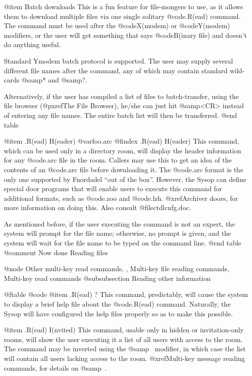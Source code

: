 @item Batch downloads
This is a fun feature for file-mongers to use, as it
allows them to download multiple files via one single solitary
@code{.R(ead)} command.  The command must be used after the @code{X(modem)}
or @code{Y(modem)} modifiers, or the user will get something that says
@code{B(inary file)} and doesn't do anything useful.

Standard Ymodem batch protocol is supported.  The user
may supply several different file names after the command, any
of which may contain standard wild-cards @samp{*} and @samp{?}.

Alternatively, if the user has compiled a list of
files to batch-transfer, using the file browser (@pxref{The File Browser}),
he/she can just hit @samp{<CR>} instead of
entering any file names.  The entire batch list will then be
transferred.
@end table

@item .R(ead) H(eader) @var{foo.arc}
@findex .R(ead) H(eader)
This command, which can be used only in a directory room, will
display the header information for any @code{.arc} file in the room.
Callers may use this to get an idea of the contents of an @code{.arc} file
before downloading it.  The @code{.arc} format is the only one supported by
Fnordadel ``out of the box''.  However, the Sysop can define special
door programs that will enable users to execute this command for
additional formats, such as @code{.zoo} and @code{.lzh}.
@xref{Archiver doors},
for more information on doing this.  Also consult @file{ctdlcnfg.doc}.

As mentioned before, if the user executing the
command is not an expert, the system will prompt for the file name;
otherwise, no prompt is given, and the system will wait for the file
name to be typed on the command line.
@end table
@comment Now done Reading files

@node Other multi-key read commands,  , Multi-key file reading commands, Multi-key read commands
@subsubsection Reading other information

@ftable @code
@item .R(ead) ?
This command, predictably, will cause the system to display a
brief help file about the @code{.R(ead)} command.  Naturally, the Sysop will
have configured the help files properly so as to make this possible.

@item .R(ead) I(nvited)
This command, usable only in hidden or invitation-only rooms,
will show the user executing it a list of all users with access to the
room.  The command may be inverted using the @samp{~} modifier, in which
case the list will contain all users lacking access to the room.
@xref{Multi-key message reading commands}, for details on @samp{~}.

